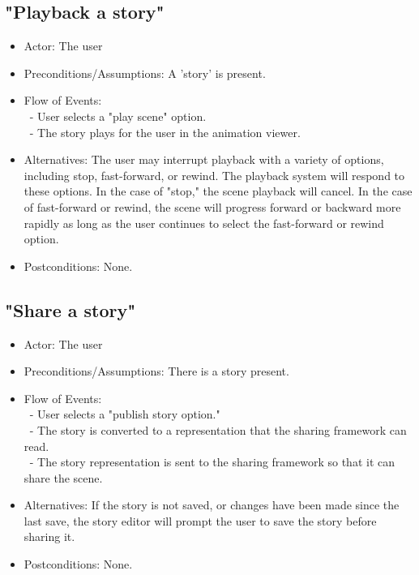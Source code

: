 \documentclass[12pt]{article}
\begin{document}
	\subsection{"Playback a story"}
\begin{itemize}
	\item Actor: The user
		\item Preconditions/Assumptions: A 'story' is present.
	\item Flow of Events: \\
	\	- User selects a "play scene" option. \\
	\	- The story plays for the user in the animation viewer.
	\item Alternatives: The user may interrupt playback with a variety
	of options, including stop, fast-forward, or rewind. The playback system will respond
	to these options. In the case of "stop," the scene playback will cancel. In the case of
	fast-forward or rewind, the scene will progress forward or backward more rapidly as long
	as the user continues to select the fast-forward or rewind option.
	\item Postconditions: None.	
\end{itemize}

		\subsection{"Share a story"}
\begin{itemize}
	\item Actor: The user
		\item Preconditions/Assumptions: There is a story present.
	\item Flow of Events: \\
	\	- User selects a "publish story option." \\
	\	- The story is converted to a representation that the sharing framework can read. \\
	\	- The story representation is sent to the sharing framework so that it can share the scene.
	\item Alternatives: If the story is not saved, or changes have been made since the last save,
	the story editor will prompt the user to save the story before sharing it.
	\item Postconditions: None.
\end{itemize}

\end{document}
